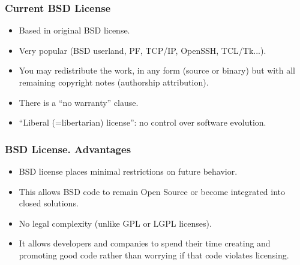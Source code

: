 \documentclass{beamer}
\begin{document}

\begin{frame}
\frametitle{Current BSD License}

\begin{itemize}
\item Based in original BSD license.
\item Very popular (BSD userland, PF, TCP/IP, OpenSSH, TCL/Tk...).
\item You may redistribute the work, in any form (source or binary)
  but with all remaining copyright notes (authorship attribution).
\item There is a ``no warranty'' clause.
\item ``Liberal (=libertarian) license'': no control over software evolution. 
\end{itemize}

\end{frame}


\begin{frame}
\frametitle{BSD License. Advantages}

\begin{itemize}
\item BSD license places minimal restrictions on future behavior.
\item This allows BSD code to remain Open Source or become integrated into closed solutions.
\item No legal complexity (unlike GPL or LGPL licenses). 
\item It allows developers and companies to spend their time creating and promoting good code rather than worrying if that code violates licensing.
\end{itemize}

\end{frame}

\end{document}
